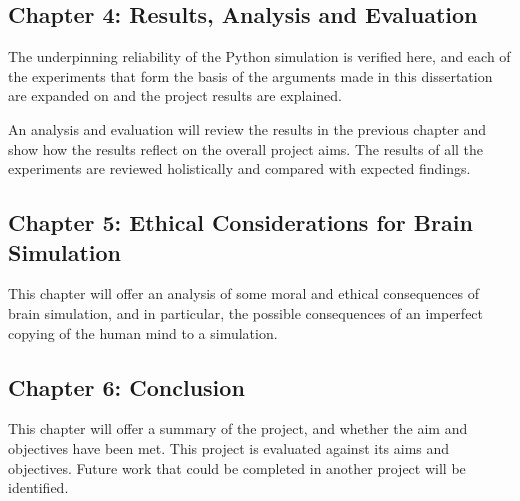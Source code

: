 \subsection*{Chapter 4: Results, Analysis and Evaluation}
The underpinning reliability of the Python simulation is verified here, and each
of the experiments that form the basis of the arguments made in this
dissertation are expanded on and the project results are explained.

An analysis and evaluation will review the results in the previous chapter and
show how the results reflect on the overall project aims. The results of all the
experiments are reviewed holistically and compared with expected findings.

\subsection*{Chapter 5: Ethical Considerations for Brain Simulation}
This chapter will offer an analysis of some moral and ethical consequences of
brain simulation, and in particular, the possible consequences of an imperfect
copying of the human mind to a simulation.

\subsection*{Chapter 6: Conclusion}
This chapter will offer a summary of the project, and whether the aim and
objectives have been met. This project is evaluated against its aims and
objectives. Future work that could be completed in another project will be
identified.